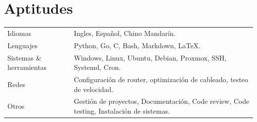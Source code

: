 \documentclass[a4paper,12pt]{article}
\begin{document}

\section{Aptitudes}
\begin{tabularx}{\linewidth}{@{}l X@{}}
Idiomas &  \normalsize{Ingles, Español, Chino Mandarín.}\\
Lenguajes  &  \normalsize{Python, Go, C, Bash, Markdown, LaTeX.}\\ 
Sistemas  \& herramientas &  \normalsize{Windows, Linux, Ubuntu, Debian, Proxmox, SSH, Systemd, Cron.}\\ 
Redes  &  \normalsize{Configuración de router, optimización de cableado, testeo de velocidad.}\\ 
Otros  &  \normalsize{Gestión de proyectos, Documentación, Code review, Code testing, Instalación de sistemas.}\\ 
\end{tabularx}

\end{document}
